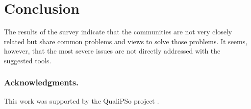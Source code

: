 \documentclass[lnbip]{svmultln}
\begin{document}
\section{Conclusion}
\label{sec:conclusion}

The results of the survey indicate that the communities are not very
closely related but share common problems and views to solve those
problems. It seems, however, that the most severe issues are not
directly addressed with the suggested tools.

\subsubsection*{Acknowledgments.}

This work was supported by the QualiPSo project \cite{url:qualipso}.
\end{document}
